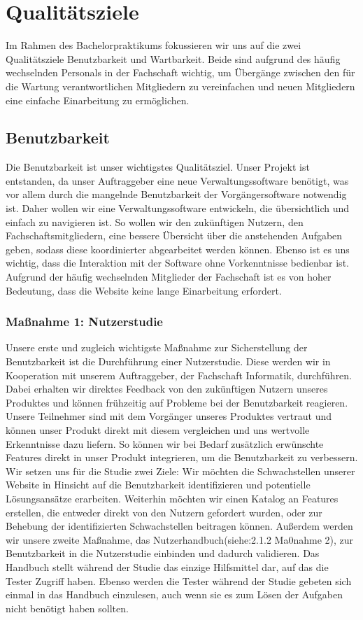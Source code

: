 \documentclass[accentcolor=tud0b,12pt,paper=a4]{tudreport}
\begin{document}
\chapter{Qualitätsziele}
Im Rahmen des Bachelorpraktikums fokussieren wir uns auf die zwei Qualitätsziele Benutzbarkeit und Wartbarkeit. Beide sind aufgrund des häufig wechselnden Personals in der Fachschaft wichtig, um Übergänge zwischen den für die Wartung verantwortlichen Mitgliedern zu vereinfachen und neuen Mitgliedern eine einfache Einarbeitung zu ermöglichen.
\section{Benutzbarkeit}
Die Benutzbarkeit ist unser wichtigstes Qualitätsziel. Unser Projekt ist entstanden, da unser Auftraggeber eine neue Verwaltungssoftware benötigt, was vor allem durch die mangelnde Benutzbarkeit der Vorgängersoftware notwendig ist. Daher wollen wir eine Verwaltungssoftware entwickeln, die übersichtlich und einfach zu navigieren ist. So wollen wir den zukünftigen Nutzern, den Fachschaftsmitgliedern, eine bessere Übersicht über die anstehenden Aufgaben geben, sodass diese koordinierter abgearbeitet werden können. 
Ebenso ist es uns wichtig, dass die Interaktion mit der Software ohne Vorkenntnisse bedienbar ist. Aufgrund der häufig wechselnden Mitglieder der Fachschaft ist es von hoher Bedeutung, dass die Website keine lange Einarbeitung erfordert.

\subsection{Maßnahme 1: Nutzerstudie}
Unsere erste und zugleich wichtigste Maßnahme zur Sicherstellung der Benutzbarkeit ist die Durchführung einer Nutzerstudie. Diese werden wir in Kooperation mit unserem Auftraggeber, der Fachschaft Informatik, durchführen. Dabei erhalten wir direktes Feedback von den zukünftigen Nutzern unseres Produktes und können frühzeitig auf Probleme bei der Benutzbarkeit reagieren. Unsere Teilnehmer sind mit dem Vorgänger unseres Produktes vertraut und können unser Produkt direkt mit diesem vergleichen und uns wertvolle Erkenntnisse dazu liefern. So können wir bei Bedarf zusätzlich erwünschte Features direkt in unser Produkt integrieren, um die Benutzbarkeit zu verbessern. 
Wir setzen uns für die Studie zwei Ziele: Wir möchten die Schwachstellen unserer Website in Hinsicht auf die Benutzbarkeit identifizieren und potentielle Lösungsansätze erarbeiten. Weiterhin möchten wir einen Katalog an Features erstellen, die entweder direkt von den Nutzern gefordert wurden, oder zur Behebung der identifizierten Schwachstellen beitragen können. 
Außerdem werden wir unsere zweite Maßnahme, das Nutzerhandbuch(siehe:2.1.2 Ma0nahme 2), zur Benutzbarkeit in die Nutzerstudie einbinden und dadurch validieren. 
Das Handbuch stellt während der Studie das einzige Hilfsmittel dar, auf das die Tester Zugriff haben.
Ebenso werden  die Tester während der Studie gebeten sich einmal in das Handbuch einzulesen, auch wenn sie es zum Lösen der Aufgaben nicht benötigt haben sollten.\\
 
\end{document}
